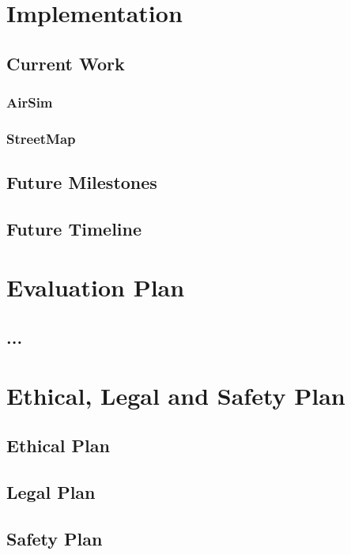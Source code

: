 \documentclass[12pt,twoside]{article}
\begin{document}
\section{Implementation}
\subsection{Current Work}
\subsubsection{AirSim}
\subsubsection{StreetMap}
\subsection{Future Milestones}
\subsection{Future Timeline}

\section{Evaluation Plan}
\subsection{...}

\section{Ethical, Legal and Safety Plan}
\subsection{Ethical Plan}
\subsection{Legal Plan}
\subsection{Safety Plan}



\newpage

\nocite{*}

\end{document}
